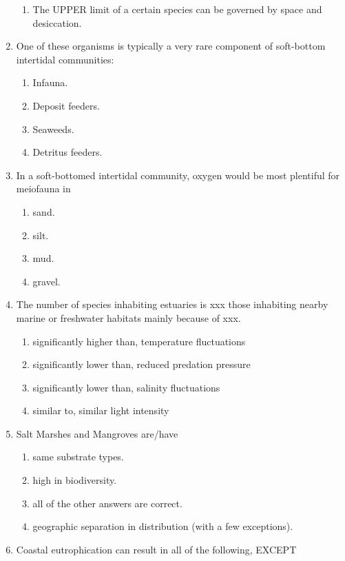 \documentclass{report}
\begin{document}
\begin{enumerate}
\begin{enumerate}
        \item   The UPPER limit of a certain species can be governed by space and desiccation.
    \end{enumerate}
    \item One of these organisms is typically a very rare component of soft-bottom intertidal communities:
    \begin{enumerate}
        \item   Infauna. 
        \item   Deposit feeders. 
        \item   Seaweeds. 
        \item   Detritus feeders. 
    \end{enumerate}
    \item In a soft-bottomed intertidal community, oxygen would be most plentiful for meiofauna in
    \begin{enumerate}
        \item   sand. 
        \item   silt. 
        \item   mud. 
        \item   gravel. 
    \end{enumerate}
    \item The number of species inhabiting estuaries is xxx those inhabiting nearby marine or freshwater habitats mainly because of xxx.
    \begin{enumerate}
        \item   significantly higher than, temperature fluctuations 
        \item   significantly lower than, reduced predation pressure 
        \item   significantly lower than, salinity fluctuations 
        \item   similar to, similar light intensity 
    \end{enumerate}
    \item Salt Marshes and Mangroves are/have
    \begin{enumerate}
        \item   same substrate types. 
        \item   high in biodiversity. 
        \item   all of the other answers are correct. 
        \item   geographic separation in distribution (with a few exceptions). 
    \end{enumerate}
    \item Coastal eutrophication can result in all of the following, EXCEPT

\end{enumerate}
\end{document}
